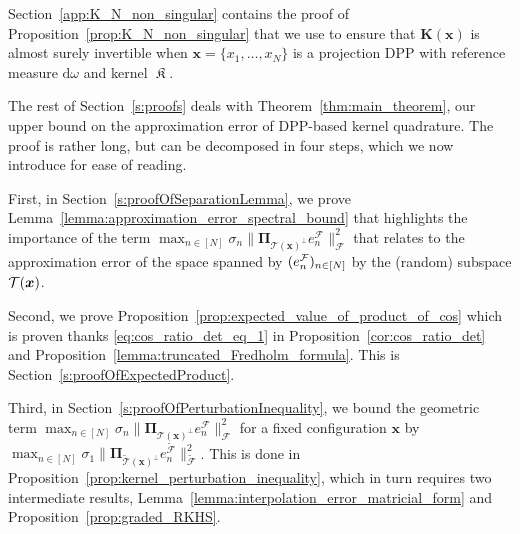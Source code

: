 \documentclass[twoside,11pt]{book}
\numberwithin{theorem}{chapter}
\numberwithin{definition}{chapter}
\numberwithin{proposition}{chapter}
\numberwithin{corollary}{chapter}
\numberwithin{example}{chapter}
\numberwithin{lemma}{chapter}
\numberwithin{assumption}{chapter}
\numberwithin{equation}{chapter}
\numberwithin{figure}{chapter}
\DeclareMathOperator*{\KDPP}{\mathfrak{K}}
\begin{document}
Section~\ref{app:K_N_non_singular} contains the proof of Proposition~\ref{prop:K_N_non_singular} that we use to ensure that $\bm{K}(\bm{x})$ is almost surely invertible when $\bm{x} = \{x_{1}, \dots , x_{N}\}$ is a projection DPP with reference measure $\mathrm{d}\omega$ and kernel $\KDPP$. 


The rest of Section~\ref{s:proofs} deals with Theorem~\ref{thm:main_theorem}, our upper bound on the approximation error of DPP-based kernel quadrature. The proof is rather long, but can be decomposed in four steps, which we now introduce for ease of reading.

First, in Section~\ref{s:proofOfSeparationLemma}, we prove Lemma~\ref{lemma:approximation_error_spectral_bound} that highlights the importance of the term $\max_{n \in [N]} \sigma_{n} \|\bm{\Pi}_{\mathcal{T}(\bm{x})^{\perp}} e_{n}^{\mathcal{F}}\|_{\mathcal{F}}^{2}$ that relates to the approximation error of the space spanned by $(e^{\cal F}_n)_{n\in[N]}$ by the (random) subspace ${\cal T}(\bm{x})$. 



Second, we prove Proposition~\ref{prop:expected_value_of_product_of_cos}
 which is proven thanks  \eqref{eq:cos_ratio_det_eq_1} in Proposition~\ref{cor:cos_ratio_det}  and Proposition~\ref{lemma:truncated_Fredholm_formula}. This is Section~\ref{s:proofOfExpectedProduct}.



Third, in Section~\ref{s:proofOfPerturbationInequality}, we bound the geometric term $\max_{n \in [N]} \sigma_{n} \|\bm{\Pi}_{\mathcal{T}(\bm{x})^{\perp}} e_{n}^{\mathcal{F}}\|_{\mathcal{F}}^{2}$ for a fixed configuration $\bm{x}$ by $\max_{n \in [N]} \sigma_{1} \|\bm{\Pi}_{\tilde{\mathcal{T}}(\bm{x})^{\perp}} e_{n}^{\tilde{\mathcal{F}}}\|_{\tilde{\mathcal{F}}}^{2}$. This is done in Proposition~\ref{prop:kernel_perturbation_inequality}, which in turn requires two intermediate results, Lemma~\ref{lemma:interpolation_error_matricial_form} and Proposition~\ref{prop:graded_RKHS}.
\end{document}
